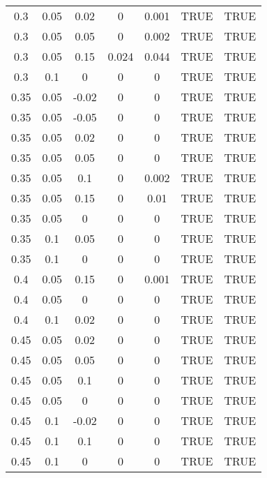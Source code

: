 \documentclass[
10pt, %
a4paper, %
oneside, %
headinclude,footinclude, %
BCOR5mm, %
]{scrartcl}
\begin{document}
\begin{table}[H]
\begin{tabular}{|c|c|c|c|c|c|c|}
		0.3   & 0.05  & 0.02  & 0          & 0.001     & TRUE       & TRUE      \\
		0.3   & 0.05  & 0.05  & 0          & 0.002     & TRUE       & TRUE      \\
		0.3   & 0.05  & 0.15  & 0.024      & 0.044     & TRUE       & TRUE      \\
		0.3   & 0.1   & 0     & 0          & 0         & TRUE       & TRUE      \\
		0.35  & 0.05  & -0.02 & 0          & 0         & TRUE       & TRUE      \\
		0.35  & 0.05  & -0.05 & 0          & 0         & TRUE       & TRUE      \\
		0.35  & 0.05  & 0.02  & 0          & 0         & TRUE       & TRUE      \\
		0.35  & 0.05  & 0.05  & 0          & 0         & TRUE       & TRUE      \\
		0.35  & 0.05  & 0.1   & 0          & 0.002     & TRUE       & TRUE      \\
		0.35  & 0.05  & 0.15  & 0          & 0.01      & TRUE       & TRUE      \\
		0.35  & 0.05  & 0     & 0          & 0         & TRUE       & TRUE      \\
		0.35  & 0.1   & 0.05  & 0          & 0         & TRUE       & TRUE      \\
		0.35  & 0.1   & 0     & 0          & 0         & TRUE       & TRUE      \\
		0.4   & 0.05  & 0.15  & 0          & 0.001     & TRUE       & TRUE      \\
		0.4   & 0.05  & 0     & 0          & 0         & TRUE       & TRUE      \\
		0.4   & 0.1   & 0.02  & 0          & 0         & TRUE       & TRUE      \\
		0.45  & 0.05  & 0.02  & 0          & 0         & TRUE       & TRUE      \\
		0.45  & 0.05  & 0.05  & 0          & 0         & TRUE       & TRUE      \\
		0.45  & 0.05  & 0.1   & 0          & 0         & TRUE       & TRUE      \\
		0.45  & 0.05  & 0     & 0          & 0         & TRUE       & TRUE      \\
		0.45  & 0.1   & -0.02 & 0          & 0         & TRUE       & TRUE      \\
		0.45  & 0.1   & 0.1   & 0          & 0         & TRUE       & TRUE      \\
		0.45  & 0.1   & 0     & 0          & 0         & TRUE       & TRUE      \\

\end{tabular}
\end{table}
\end{document}

